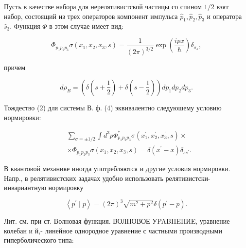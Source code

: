 \documentclass[10pt]{article}
\begin{document}
Пусть в качестве набора для нерелятивистской частицы со спином $1 / 2$ взят набор, состоящий из трех операторов компонент импульса $\hat{p}_{1}, \hat{p}_{2}, \hat{p}_{3}$ и оператора $\hat{s}_{3}$. Функция $\Phi$ в этом случае имеет вид:



\[

\Phi_{p_{1} p_{2} p_{3}} \sigma\left(x_{1}, x_{2}, x_{3}, s\right)=\frac{1}{(2 \pi)^{3 / 2}} \exp \left(\frac{i p x}{\hbar}\right) \delta_{\sigma_{s}},

\]



причем



\[

d \rho_{B}=\left(\delta\left(s+\frac{1}{2}\right)+\delta\left(s-\frac{1}{2}\right)\right) d p_{1} d p_{2} d p_{3} .

\]



Тождество (2) для системы В. ф. (4) эквивалентно следуюшему условию нормировки:



\[

\begin{aligned}

& \sum_{\sigma= \pm 1 / 2} \int d^{3} p \Phi_{p_{1} p_{2} p_{3}}^{*} \sigma\left(x_{1}^{\prime}, x_{2}^{\prime}, x_{3}^{\prime}, s\right) \times \\

& \times \Phi_{p_{1} p_{2} p_{3}} \sigma\left(x_{1}, x_{2}, x_{3}, s\right)=\delta\left(x^{\prime}-x\right) \delta_{s s^{\prime}} .

\end{aligned}

\]



В квантовой механике иногда употребляются и другие условия нормировки. Напр., в релятивистских задачах удобно использовать релятивистски-инвариантную нормировку



\[

\left\langle p^{\prime} \mid p\right\rangle=(2 \pi)^{3} \sqrt{m^{2}+p^{2}} \delta\left(p^{\prime}-p\right) .

\]



Лит. см. при ст. Волновая функция. ВОЛНОВОЕ УPABHEHИE, уравнение колебан и й,- линейное однородное уравнение с частными производными гиперболического типа:
\end{document}
